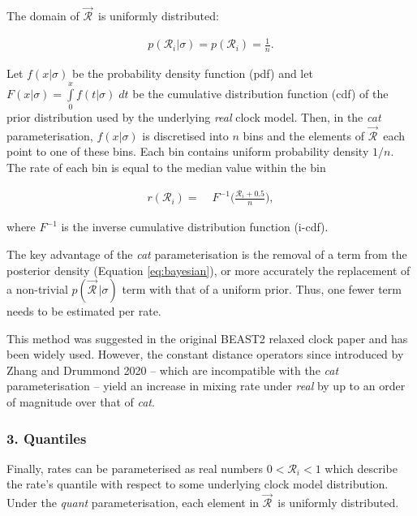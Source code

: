 \documentclass[10pt,letterpaper]{article}
\begin{document}
The domain of $\vec{\mathcal{R}}^{\,}$ is uniformly distributed:


\begin{align}
p(\mathcal{R}_i | \sigma) = p(\mathcal{R}_i) = \frac{1}{n}.
\end{align}



Let $f(x|\sigma)$ be the probability density function (pdf) and let $F(x|\sigma) = \int\limits_{0}^{x} f(t|\sigma) \; dt$ be the cumulative distribution function (cdf) of the prior distribution used by the underlying \textit{real} clock model. Then, in the \textit{cat} parameterisation, $f(x|\sigma)$ is discretised into $n$ bins and the elements of $\vec{\mathcal{R}}^{\,}$ each point to one of these bins. Each bin contains uniform probability density $1/n$. The rate of each bin is equal to the median value within the bin 


\begin{align}
r(\mathcal{R}_i) =& \; F^{-1}\big(\frac{\mathcal{R}_i + 0.5}{n}\big),
\end{align}

where $F^{-1}$ is the inverse cumulative distribution function (i-cdf).



The key advantage of the \textit{cat} parameterisation is the removal of a term from the posterior density (Equation \ref{eq:bayesian}), or more accurately the replacement of a non-trivial $p(\vec{\mathcal{R}}^{\,} | \sigma)$ term with that of a uniform prior. Thus, one fewer term needs to be estimated per rate.



This method was suggested in the original BEAST2 relaxed clock paper \cite{drummond2006relaxed} and has been widely used. However, the constant distance operators since introduced by Zhang and Drummond 2020 -- which are incompatible with the \textit{cat} parameterisation -- yield an increase in mixing rate under \textit{real} by up to an order of magnitude over that of \textit{cat}.






\subsubsection*{3. Quantiles}


Finally, rates can be parameterised as real numbers $0 < \mathcal{R}_i < 1$ which describe the rate's quantile with respect to some underlying clock model distribution. Under the  \textit{quant} parameterisation, each element in $\vec{\mathcal{R}}^{\,}$ is uniformly distributed.
\end{document}
